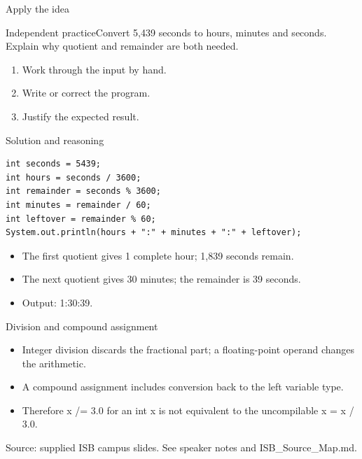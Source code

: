 \documentclass[10pt,aspectratio=169]{beamer}
\begin{document}
\begin{frame}[fragile,t]{Apply the idea}
\begin{alertblock}{Independent practice}Convert 5,439 seconds to hours, minutes and seconds. Explain why quotient and remainder are both needed.\end{alertblock}\vspace{3mm}\begin{enumerate}\item Work through the input by hand.\item Write or correct the program.\item Justify the expected result.\end{enumerate}
\end{frame}

\begin{frame}[fragile,t]{Solution and reasoning}
\begin{lstlisting}
int seconds = 5439;
int hours = seconds / 3600;
int remainder = seconds % 3600;
int minutes = remainder / 60;
int leftover = remainder % 60;
System.out.println(hours + ":" + minutes + ":" + leftover);
\end{lstlisting}\vspace{1mm}\small\begin{itemize}
\item The first quotient gives 1 complete hour; 1,839 seconds remain.
\item The next quotient gives 30 minutes; the remainder is 39 seconds.
\item Output: 1:30:39.
\end{itemize}
\end{frame}

\begin{frame}[fragile,t]{Division and compound assignment}
\begin{itemize}
\item Integer division discards the fractional part; a floating{-}point operand changes the arithmetic.
\item A compound assignment includes conversion back to the left variable type.
\item Therefore x /= 3.0 for an int x is not equivalent to the uncompilable x = x / 3.0.
\end{itemize}
\vspace{3mm}\footnotesize\textcolor{accent}{Source: supplied ISB campus slides. See speaker notes and ISB\_Source\_Map.md.}
\end{frame}
\end{document}
